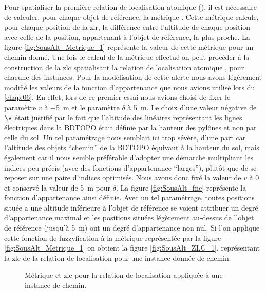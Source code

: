 Pour spatialiser la première relation de localisation atomique
(), il est nécessaire de calculer, pour
chaque objet de référence, la métrique
. Cette métrique calcule, pour chaque
position de la \ac{zir}, la différence entre l'altitude de chaque
position avec celle de la position, appartenant à l'objet de
référence, la plus proche. La figure \ref{fig:SousAlt_Metrique_1}
représente la valeur de cette métrique pour un chemin donné. Une fois
le calcul de la métrique effectué on peut procéder à la construction
de la \ac{zlc} spatialisant la relation de localisation atomique
, pour chacune des instances. Pour la
modélisation de cette alerte nous avons légèrement modifié les valeurs
de la fonction d'appartenance que nous avions utilisé lors du
\autoref{chap:06}. En effet, lors de ce premier essai nous avions
choisi de fixer le paramètre \(v\) à \SI{-5}{\meter} et le paramètre
\(\delta\) à \SI{5}{\meter}. Le choix d'une valeur négative de \(\v\)
était justifié par le fait que l'altitude des linéaires représentant
les lignes électriques dans la BDTOPO était définie par la hauteur des
pylônes et non par celle du sol. Un tel paramétrage nous semblait ici
trop sévère, d'une part car l'altitude des objets \enquote{chemin} de
la BDTOPO équivaut à la hauteur du sol, mais également car il nous
semble préférable d'adopter une démarche multipliant les indices peu
précis (\ie avec des fonctions d'appartenance \enquote{larges}),
plutôt que de se reposer sur une paire d'indices optimisés. Nous avons
donc fixé la valeur de \(v\) à 0 et conservé la valeur de
\SI{5}{\meter} pour \(\delta\). La figure \ref{fig:SousAlt_fnc}
représente la fonction d'appartenance ainsi définie. Avec un tel
paramétrage, toutes positions située a une altitude inférieure à
l'objet de référence se voient attribuer un degré d'appartenance
maximal et les positions situées légèrement au-dessus de l'objet de
référence (jusqu'à \SI{5}{\meter}) ont un degré d'appartenance non
nul. Si l'on applique cette fonction de fuzzyfication à la métrique
représentée par la figure \ref{fig:SousAlt_Metrique_1} on obtient la
figure \ref{fig:SousAlt_ZLC_1}, représentant la \ac{zlc} de la
relation de localisation  pour une instance
donnée de chemin.

\begin{figure}
  \centering
  
  \caption{Métrique \protect{} et
    \ac{zlc} \protect{} pour la relation de
    localisation \protect{} appliquée à une
    instance de chemin.}
  \label{fig:SousAlt_1}
\end{figure}

